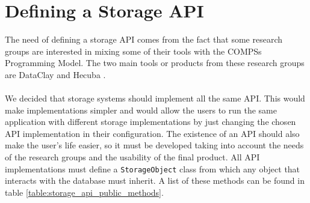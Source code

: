 \section{Defining a Storage API}
\label{subsec:storage_api}
The need of defining a storage API comes from the fact that some research groups are interested in mixing some of their tools with the COMPSs Programming Model. The two main tools or products from these research groups are DataClay \cite{DataClay} and Hecuba \cite{alomar2015hecuba}.\\
\\
We decided that storage systems should implement all the same API. This would make implementations simpler and would allow the users to run the same application with different storage implementations by just changing the chosen API implementation in their configuration. The existence of an API should also make the user's life easier, so it must be developed taking into account the needs of the research groups and the usability of the final product. All API implementations must define a \verb|StorageObject| class from which any object that interacts with the database must inherit. A list of these methods can be found in table \ref{table:storage_api_public_methods}.


